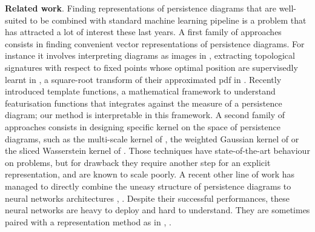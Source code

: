 \documentclass[twoside]{article}
\begin{document}
\noindent
\textbf{Related work}. Finding representations of persistence diagrams that are well-suited to be combined with standard machine learning pipeline is a problem that has attracted a lot of interest these last years.  
A first family of approaches consists in finding convenient vector representations of persistence diagrams. For instance it involves interpreting diagrams as images in \cite{Adams2017}, extracting topological signatures with respect to fixed points whose optimal position are supervisedly learnt in \cite{hofer2017deep}, a square-root transform of their approximated pdf in \cite{Anirudh}. Recently \cite{Perea2019ApproximatingCF} introduced template functions, a mathematical framework to understand featurisation functions that integrates against the measure of a persistence diagram; our method is interpretable in this framework.
A second family of approaches consists in designing specific kernel on the space of persistence diagrams, such as the multi-scale kernel of \cite{Reininghaus2015}, the weighted Gaussian kernel of \cite{Kusano2016} or the sliced Wasserstein kernel of \cite{Carriere2017}. Those techniques have state-of-the-art behaviour on problems, but for drawback they require another step for an explicit representation, and are known to scale poorly.
A recent other line of work has managed to directly combine the uneasy structure of persistence diagrams to neural networks architectures \cite{Zaheer2017}, \cite{perslay}. Despite their successful performances, these neural networks are heavy to deploy and hard to understand. They are sometimes paired with a representation method as in \cite{hofer2017deep}, \cite{hofer2019graph}.
\end{document}
